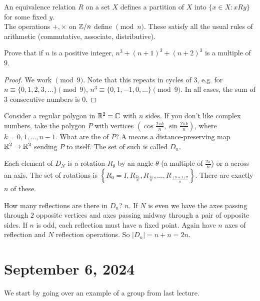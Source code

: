 \documentclass[12pt]{scrartcl}
\begin{document}
An equivalence relation $R$ on a set $X$ defines a partition of $X$ into  $\{x \in X : xRy\}$ for some fixed $y$. \\

The operations $+, \times$ on $\mathbb Z / n$ define  $\pmod n$. These satisfy all the usual rules of arithmetic (commutative, associate, distributive).

\begin{example}
    Prove that if $n$ is a positive integer, $n^3 + (n+1)^3 + (n+2)^3$ is a multiple of $9$.
\end{example}

\begin{proof}
    We work $\pmod 9$. Note that this repeats in cycles of $3$, e.g. for $n \equiv \{0, 1, 2, 3, \ldots\} \pmod 9$, $n^3 \equiv \{0, 1, -1, 0, \ldots\} \pmod 9$. In all cases, the sum of $3$ consecutive numbers is $0$.
\end{proof}

\begin{example}
    Consider a regular polygon in $\mathbb R^2 = \mathbb C$ with $n$ sides. If you don't like complex numbers, take the polygon $P$ with vertices $\left(\cos \frac{2\pi k}{n}, \sin\frac{2\pi k}{n}\right)$, where $k = 0, 1, \ldots, n-1$. What are the  of $P$? A  means a distance-preserving map $\mathbb R^2 \to \mathbb R^2$ sending $P$ to itself. The set of such is called $D_n$.
\end{example}

\begin{fact}
    Each element of $D_N$ is a rotation $R_{\theta}$ by an angle $\theta$ (a multiple of $\frac{2\pi}{n}$) or a  across an axis. The set of rotations is $\left\{R_0 = I, R_{\frac{2\pi}{n}}, R_{\frac{4\pi}{n}}, \ldots, R_{\frac{(n-1)\pi}{n}}\right\}$. There are exactly $n$ of these.
\end{fact}

How many reflections are there in $D_n$? $n$. If $N$ is even we have the axes passing through $2$ opposite vertices and axes passing midway through a pair of opposite sides. If $n$ is odd, each reflection must have a fixed point. Again have $n$ axes of reflection and $N$ reflection operations. So $|D_n| = n + n = 2n$.

\section{September 6, 2024}
We start by going over an example of a group from last lecture.
\end{document}
